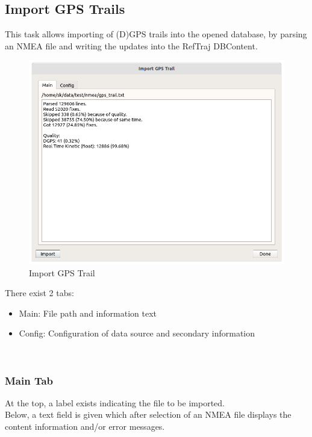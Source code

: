 \subsection{Import GPS Trails}
\label{sec:ui_import_gps}

This task allows importing of (D)GPS trails into the opened database, by parsing an NMEA file and writing the updates into the RefTraj DBContent.

\begin{figure}[H]
  \center
    \includegraphics[width=16cm]{figures/gps_import_task.png}
  \caption{Import GPS Trail}
\end{figure}

There exist 2 tabs:

\begin{itemize}
\item Main: File path and information text
\item Config: Configuration of data source and secondary information
\end{itemize}
\ \\

\subsubsection{Main Tab}

At the top, a label exists indicating the file to be imported. \\

Below, a text field is given which after selection of an NMEA file displays the content information and/or error messages. \\

